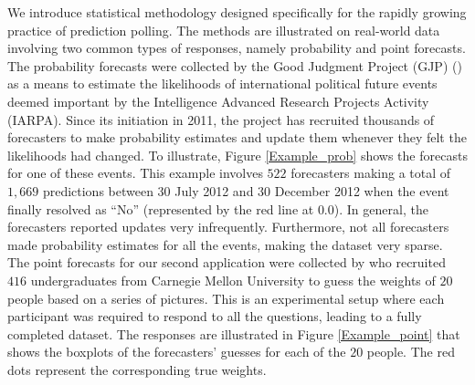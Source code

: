\documentclass[11pt]{article}
\theoremstyle{definition}
\theoremstyle{definition}
\begin{document}
We introduce statistical methodology designed specifically for the rapidly growing practice of prediction polling. The methods are illustrated on real-world data involving two common types of responses, namely probability and point forecasts. The probability forecasts were collected 
by the Good Judgment Project (GJP) (\citealt{ungar2012good, mellers2014psychological}) as a means to estimate the likelihoods of international political future events deemed important by the Intelligence Advanced Research Projects Activity (IARPA). 
Since its initiation in 2011, the project has recruited thousands of forecasters to make probability estimates and update them whenever they felt the likelihoods had changed. To illustrate, Figure \ref{Example_prob} shows the forecasts for one of these events. This example involves $522$ forecasters making a total of $1,669$ predictions between 30 July 2012 and 30 December 2012 when the event finally resolved as ``No'' (represented by the red line at $0.0$). 
In general, the forecasters reported updates very infrequently. Furthermore, not all forecasters made probability estimates for all the events, making the dataset very sparse. The point forecasts for our second application were collected by \cite{moore2008use} who recruited $416$ undergraduates from Carnegie Mellon University to guess the weights of $20$ people based on a series of pictures. This is an experimental setup where each participant was required to respond to all the questions, leading to a fully completed dataset. The responses are illustrated in Figure \ref{Example_point} that shows the boxplots of the forecasters' guesses for each of the $20$ people. The red dots represent the corresponding true weights.
\end{document}
